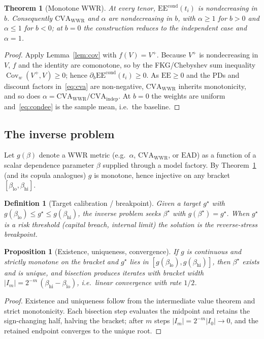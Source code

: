 \documentclass[twocolumn,10pt]{article}
\newtheorem{theorem}{Theorem}
\newtheorem{proposition}{Proposition}
\newtheorem{definition}{Definition}
\newcommand{\Cov}{\operatorname{Cov}}
\newcommand{\EE}{\mathrm{EE}}
\newcommand{\CVA}{\mathrm{CVA}}
\newcommand{\EAD}{\mathrm{EAD}}
\begin{document}
\begin{theorem}[Monotone WWR]\label{thm:mono}
At every tenor, $\EE^{\mathrm{cond}}(t_i)$ is nondecreasing in $b$. Consequently
$\CVA_{\text{WWR}}$ and $\alpha$ are nondecreasing in $b$, with $\alpha\ge1$ for
$b>0$ and $\alpha\le1$ for $b<0$; at $b=0$ the construction reduces to the
independent case and $\alpha=1$.
\end{theorem}
\begin{proof}
Apply Lemma~\ref{lem:cov} with $f(V)=V^{+}$. Because $V^{+}$ is nondecreasing in
$V$, $f$ and the identity are comonotone, so by the FKG/Chebyshev sum inequality
$\Cov_w(V^{+},V)\ge0$; hence $\partial_b\EE^{\mathrm{cond}}(t_i)\ge0$. As
$\EE\ge0$ and the PDs and discount factors in~\eqref{eq:cva} are non-negative,
$\CVA_{\text{WWR}}$ inherits monotonicity, and so does
$\alpha=\CVA_{\text{WWR}}/\CVA_{\text{indep}}$. At $b=0$ the weights are uniform
and~\eqref{eq:condee} is the sample mean, i.e.\ the baseline.
\end{proof}

\subsection{The inverse problem}
Let $g(\beta)$ denote a WWR metric (e.g.\ $\alpha$, $\CVA_{\text{WWR}}$, or
$\EAD$) as a function of a scalar dependence parameter $\beta$ supplied through a
model factory. By Theorem~\ref{thm:mono} (and its copula analogues) $g$ is
monotone, hence injective on any bracket $[\beta_{\mathrm{lo}},\beta_{\mathrm{hi}}]$.

\begin{definition}[Target calibration / breakpoint]
Given a target $g^\star$ with
$g(\beta_{\mathrm{lo}})\le g^\star\le g(\beta_{\mathrm{hi}})$, the inverse
problem seeks $\beta^\star$ with $g(\beta^\star)=g^\star$. When $g^\star$ is a
risk \emph{threshold} (capital breach, internal limit) the solution is the
reverse-stress \emph{breakpoint}.
\end{definition}

\begin{proposition}[Existence, uniqueness, convergence]
If $g$ is continuous and strictly monotone on the bracket and $g^\star$ lies in
$[g(\beta_{\mathrm{lo}}),g(\beta_{\mathrm{hi}})]$, then $\beta^\star$ exists and
is unique, and bisection produces iterates with bracket width
$|I_m|=2^{-m}\,(\beta_{\mathrm{hi}}-\beta_{\mathrm{lo}})$, i.e.\ linear
convergence with rate $1/2$.
\end{proposition}
\begin{proof}
Existence and uniqueness follow from the intermediate value theorem and strict
monotonicity. Each bisection step evaluates the midpoint and retains the
sign-changing half, halving the bracket; after $m$ steps
$|I_m|=2^{-m}|I_0|\to0$, and the retained endpoint converges to the unique root.
\end{proof}
\end{document}
